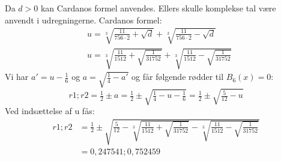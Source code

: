 Da \(d>0\) kan Cardanos formel anvendes. Ellers skulle komplekse tal være anvendt i udregningerne. Cardanos formel:
\begin{align*}
&u=\sqrt[3]{\tfrac{11}{756 \cdot 2}+\sqrt{d}}+\sqrt[3]{\tfrac{11}{756 \cdot 2}-\sqrt{d}}\\
&u=\sqrt[3]{\tfrac{11}{1512}+\sqrt{\tfrac{1}{31752}}}+\sqrt[3]{\tfrac{11}{1512}-\sqrt{\tfrac{1}{31752}}}
\end{align*}
Vi har \(a'=u-\tfrac{1}{6}\) og \(a=\sqrt{\tfrac{1}{4}-a'}\) og får følgende rødder til \(B_{6}(x)=0\):
\[r1;r2 = \tfrac{1}{2} \pm a = \tfrac{1}{2} \pm \sqrt{\tfrac{1}{4}-u-\tfrac{1}{6}}=\tfrac{1}{2} \pm \sqrt{\tfrac{5}{12}-u}\]
Ved indsættelse af u fås:
\begin{align*}
r1;r2 &= \tfrac{1}{2} \pm \sqrt{\tfrac{5}{12}-\sqrt[3]{\tfrac{11}{1512}+\sqrt{\tfrac{1}{31752}}}-\sqrt[3]{\tfrac{11}{1512}-\sqrt{\tfrac{1}{31752}}}}\\
&=0,247541;0,752459
\end{align*}

